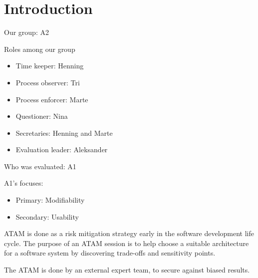 \section{Introduction}
\label{sec:introduction}

Our group: A2

Roles among our group
\begin{itemize}
  \item Time keeper: Henning
  \item Process observer: Tri
  \item Process enforcer: Marte
  \item Questioner: Nina
  \item Secretaries: Henning and Marte
  \item Evaluation leader: Aleksander
\end{itemize}

Who was evaluated: A1

A1's focuses:
\begin{itemize}
  \item Primary: Modifiability
  \item Secondary: Usability
\end{itemize}

ATAM is done as a risk mitigation strategy early in the software development
life cycle. The purpose of an ATAM session is to help choose a suitable
architecture for a software system by discovering trade-offs and sensitivity
points. 

The ATAM is done by an external expert team, to secure against biased results. 
